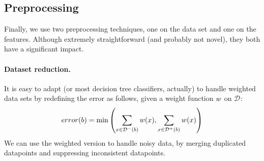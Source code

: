 \documentclass{llncs}
\def\posclass{+}
\def\negclass{-}
\def\datasymb{D}
\newcommand{\setex}[1]{\ensuremath{{\mathcal \datasymb}^{#1}}\xspace}
\newcommand{\posex}{{\setex{\posclass}}\xspace}
\newcommand{\negex}{{\setex{\negclass}}\xspace}
\newcommand{\allex}{{\setex{}}\xspace}
\newcommand{\afeat}[0]{\ensuremath{f}}
\newcommand{\weight}[1][]{\ensuremath{\ifthenelse{\equal{#1}{}}{w}{w({#1})}}}
\newcommand{\error}[1][]{\ensuremath{\ifthenelse{\equal{#1}{}}{{error}}{{error({{#1}})}}}}
\newcommand{\abranch}[0]{\ensuremath{b}}
\newcommand{\numex}[0]{\ensuremath{n}}
\newcommand{\numfeat}[0]{\ensuremath{m}}
\newcommand{\mdepth}[0]{\ensuremath{k}}
\begin{document}




















\subsection{Preprocessing}
\label{sec:preprocessing}

Finally, we use two preprocessing techniques, one on the data set and one on the features. Although extremely straightforward (and probably not novel), they both have a significant impact.

\paragraph{Dataset reduction.}
It is easy to adapt \budalg (or most decision tree classifiers, actually) to handle weighted data sets by redefining the error as follows, given a weight function $\weight$ on $\allex$:
$$
\error[\abranch] = \min\left( \sum\limits_{x \in \negex(\abranch)}\weight[x], \sum\limits_{x \in \posex(\abranch)}\weight[x] \right)
$$
We can use the weighted version to handle noisy data, by merging duplicated datapoints and suppressing inconsistent datapoints.
\end{document}
